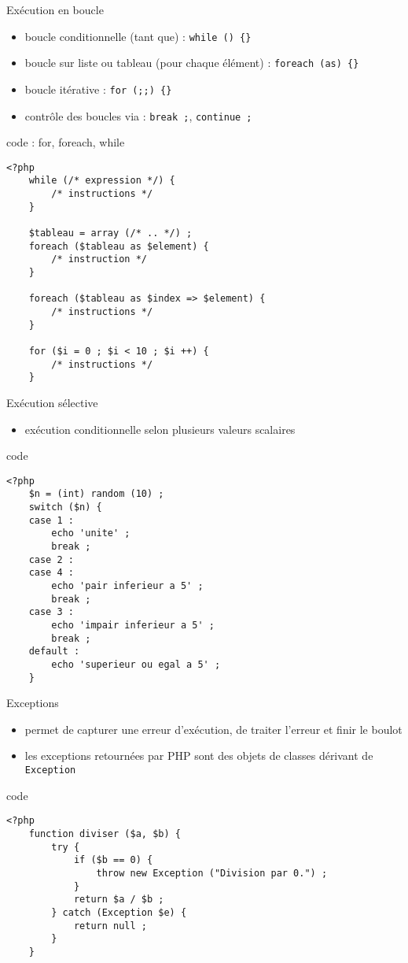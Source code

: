 \begin{frame}[containsverbatim]{Exécution en boucle} %
\begin{itemize}
\item boucle conditionnelle (tant que) : \texttt{while () \{\}}
\item boucle sur liste ou tableau (pour chaque élément) : \texttt{foreach (as) \{\}}
\item boucle itérative : \texttt{for (;;) \{\}}
\item contrôle des boucles via : \lstinline!break ;!, \lstinline!continue ;!
\end{itemize}
\begin{block}{code : for, foreach, while}
\begin{lstlisting}
<?php
	while (/* expression */) {
		/* instructions */
	}
	
	$tableau = array (/* .. */) ;
	foreach ($tableau as $element) {
		/* instruction */
	}
	
	foreach ($tableau as $index => $element) {
		/* instructions */
	}
	
	for ($i = 0 ; $i < 10 ; $i ++) {
		/* instructions */
	}
\end{lstlisting}
\end{block}
\end{frame}

\begin{frame}[containsverbatim]{Exécution sélective} %
\begin{itemize}
\item exécution conditionnelle selon plusieurs valeurs scalaires
\end{itemize}
\begin{block}{code}
\begin{lstlisting}
<?php
	$n = (int) random (10) ;
	switch ($n) {
	case 1 :
		echo 'unite' ;
		break ;
	case 2 :
	case 4 :
		echo 'pair inferieur a 5' ;
		break ;
	case 3 :
		echo 'impair inferieur a 5' ;
		break ;
	default :
		echo 'superieur ou egal a 5' ;
	}
\end{lstlisting}
\end{block}
\end{frame}

\begin{frame}[containsverbatim]{Exceptions} %
\begin{itemize}
\item permet de capturer une erreur d'exécution, de traiter l'erreur et finir le boulot
\item les exceptions retournées par PHP sont des objets de classes dérivant de \texttt{Exception}
\end{itemize}
\begin{block}{code}
\begin{lstlisting}
<?php
	function diviser ($a, $b) {
		try {
			if ($b == 0) { 
				throw new Exception ("Division par 0.") ;
			}
			return $a / $b ;
		} catch (Exception $e) {
			return null ;
		}
	}
\end{lstlisting}
\end{block}
\end{frame}

